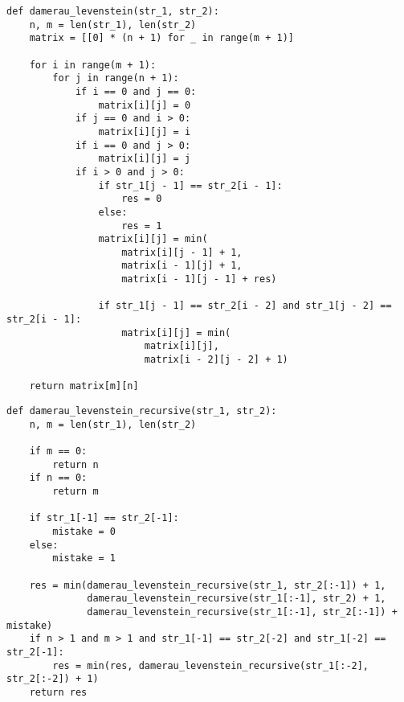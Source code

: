 \begin{center}
    \captionsetup{justification=raggedright,singlelinecheck=off}
    \begin{lstlisting}[label=lst:d_l_matr,caption=Итерационный алгоритм поиска расстояния Дамерау-Левенштейна]
def damerau_levenstein(str_1, str_2):
    n, m = len(str_1), len(str_2)
    matrix = [[0] * (n + 1) for _ in range(m + 1)]

    for i in range(m + 1):
        for j in range(n + 1):
            if i == 0 and j == 0:
                matrix[i][j] = 0
            if j == 0 and i > 0:
                matrix[i][j] = i
            if i == 0 and j > 0:
                matrix[i][j] = j
            if i > 0 and j > 0:
                if str_1[j - 1] == str_2[i - 1]:
                    res = 0
                else:
                    res = 1
                matrix[i][j] = min(
                    matrix[i][j - 1] + 1,
                    matrix[i - 1][j] + 1,
                    matrix[i - 1][j - 1] + res)

                if str_1[j - 1] == str_2[i - 2] and str_1[j - 2] == str_2[i - 1]:
                    matrix[i][j] = min(
                        matrix[i][j],
                        matrix[i - 2][j - 2] + 1)

    return matrix[m][n]
\end{lstlisting}
\end{center}


\begin{center}
    \captionsetup{justification=raggedright,singlelinecheck=off}
    \begin{lstlisting}[label=lst:d_l_rec,caption=Рекурсивный алгоритм поиска расстояния Дамерау-Левенштейна]
def damerau_levenstein_recursive(str_1, str_2):
    n, m = len(str_1), len(str_2)

    if m == 0:
        return n
    if n == 0:
        return m

    if str_1[-1] == str_2[-1]:
        mistake = 0
    else:
        mistake = 1

    res = min(damerau_levenstein_recursive(str_1, str_2[:-1]) + 1,
              damerau_levenstein_recursive(str_1[:-1], str_2) + 1,
              damerau_levenstein_recursive(str_1[:-1], str_2[:-1]) + mistake)
    if n > 1 and m > 1 and str_1[-1] == str_2[-2] and str_1[-2] == str_2[-1]:
        res = min(res, damerau_levenstein_recursive(str_1[:-2], str_2[:-2]) + 1)
    return res
\end{lstlisting}
\end{center}


